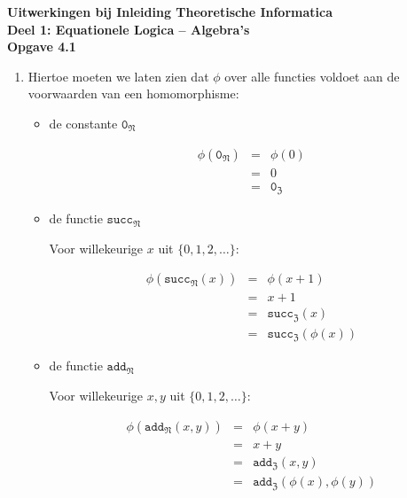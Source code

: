 \documentclass[a4paper,11pt]{article}
\begin{document}
{\bf Uitwerkingen bij Inleiding Theoretische Informatica\\
Deel 1: Equationele Logica -- Algebra's}\\[2em]


{\bf Opgave 4.1}

\begin{enumerate}

\item %
Hiertoe moeten we laten zien dat $\phi$ over alle functies voldoet aan de
voorwaarden van een homomorphisme:

\begin{itemize}

\item{de constante $\texttt{0}_{\mathfrak{N}}$}

  \begin{eqnarray*}
    \phi(\texttt{0}_{\mathfrak{N}}) & = & \phi(0) \\
                                  & = & 0 \\
                                  & = & \texttt{0}_{\mathfrak{Z}}
  \end{eqnarray*}

\item{de functie $\texttt{succ}_{\mathfrak{N}}$}

  Voor willekeurige $x$ uit $\{0,1,2,\ldots\}$:

  \begin{eqnarray*}
    \phi(\texttt{succ}_{\mathfrak{N}}(x)) & = & \phi(x+1) \\
                                        & = & x+1 \\
                                        & = & \texttt{succ}_{\mathfrak{Z}}(x) \\
                                        & = & \texttt{succ}_{\mathfrak{Z}}(\phi(x))
  \end{eqnarray*}

\item{de functie $\texttt{add}_{\mathfrak{N}}$}

  Voor willekeurige $x,y$ uit $\{0,1,2,\ldots\}$:

  \begin{eqnarray*}
    \phi(\texttt{add}_{\mathfrak{N}}(x,y)) & = & \phi(x+y) \\
                                         & = & x+y \\
                                         & = & \texttt{add}_{\mathfrak{Z}}(x,y) \\
                                         & = &
                                         \texttt{add}_{\mathfrak{Z}}(\phi(x),\phi(y))
  \end{eqnarray*}


\end{itemize}
\end{enumerate}
\end{document}
